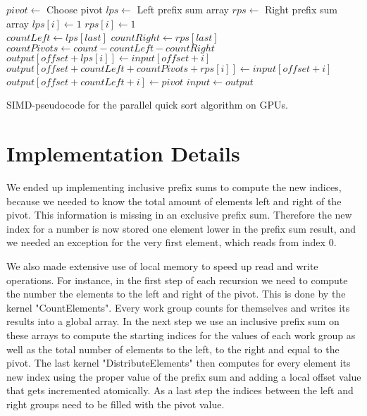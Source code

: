 \documentclass{llncs}
\begin{document}
\begin{algorithm}[h]
\begin{algorithmic}
\State $pivot \gets$ Choose pivot
\State $lps \gets$ Left prefix sum array
\State $rps \gets$ Right prefix sum array
  \State $lps[i] \gets 1$
  \State $rps[i] \gets 1$
\EndIf\\
\State {}
\State {}
\State $countLeft \gets lps[last]$
\State $countRight \gets rps[last]$
\State $countPivots \gets count - countLeft - countRight$\\
  \State $output[offset + lps[i]] \gets input[offset + i]$
  \State $output[offset + countLeft + countPivots + rps[i]] \gets input[offset + i]$
\EndIf
{}
  \State $output[offset + countLeft +i] \gets pivot$
\EndIf
\State $input \gets output$
\State {}
\State {}
\EndFunction
\end{algorithmic}
\label{alg1}
\caption{SIMD-pseudocode for the parallel quick sort algorithm on GPUs.}
\end{algorithm}

\section{Implementation Details}
We ended up implementing inclusive prefix sums to compute the new indices, because we needed to know the total amount of elements left and right of the pivot. This information is missing in an exclusive prefix sum. Therefore the new index for a number is now stored one element lower in the prefix sum result, and we needed an exception for the very first element, which reads from index 0.

We also made extensive use of local memory to speed up read and write operations. For instance, in the first step of each recursion we need to compute the number the elements to the left and right of the pivot. This is done by the kernel "CountElements". Every work group counts for themselves and writes its results into a global array. In the next step we use an inclusive prefix sum on these arrays to compute the starting indices for the values of each work group as well as the total number of elements to the left, to the right and equal to the pivot. The last kernel "DistributeElements" then computes for every element its new index using the proper value of the prefix sum and adding a local offset value that gets incremented atomically. As a last step the indices between the left and right groups need to be filled with the pivot value.
\end{document}

